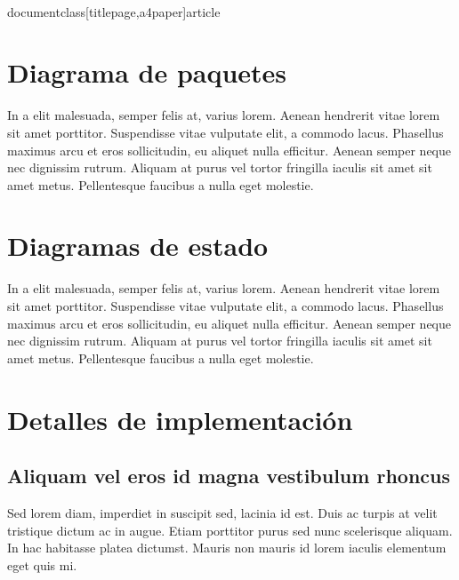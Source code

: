 \\documentclass[titlepage,a4paper]{article}
\begin{document}
\section{Diagrama de paquetes}\label{sec:implementacion}

In a elit malesuada, semper felis at, varius lorem. Aenean hendrerit vitae lorem sit amet porttitor. Suspendisse vitae vulputate elit, a commodo lacus. Phasellus maximus arcu et eros sollicitudin, eu aliquet nulla efficitur. Aenean semper neque nec dignissim rutrum. Aliquam at purus vel tortor fringilla iaculis sit amet sit amet metus. Pellentesque faucibus a nulla eget molestie.


\section{Diagramas de estado}

In a elit malesuada, semper felis at, varius lorem. Aenean hendrerit vitae lorem sit amet porttitor. Suspendisse vitae vulputate elit, a commodo lacus. Phasellus maximus arcu et eros sollicitudin, eu aliquet nulla efficitur. Aenean semper neque nec dignissim rutrum. Aliquam at purus vel tortor fringilla iaculis sit amet sit amet metus. Pellentesque faucibus a nulla eget molestie.

\section{Detalles de implementación}


\subsection{Aliquam vel eros id magna vestibulum rhoncus}
Sed lorem diam, imperdiet in suscipit sed, lacinia id est. Duis ac turpis at velit tristique dictum ac in augue. Etiam porttitor purus sed nunc scelerisque aliquam. In hac habitasse platea dictumst. Mauris non mauris id lorem iaculis elementum eget quis mi.
\end{document}
